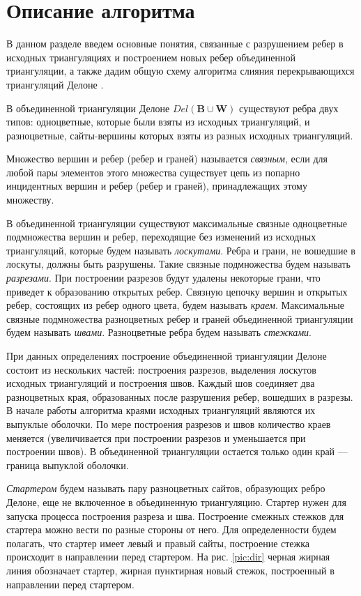 \documentclass[12pt]{article}
\begin{document}
\section{Описание алгоритма}
В данном разделе введем основные понятия, связанные с разрушением ребер в исходных триангуляциях
и построением новых ребер объединенной триангуляции,
а также дадим общую схему алгоритма слияния перекрывающихся триангуляций Делоне \cite{MestOverlap}.

В объединенной триангуляции Делоне $Del(\textbf{B} \cup \textbf{W})$ существуют ребра двух типов:
одноцветные, которые были взяты из исходных триангуляций, и разноцветные, сайты-вершины которых взяты из разных исходных триангуляций.

Множество вершин и ребер (ребер и граней) называется {\itshape связным}, если для любой пары элементов этого множества
существует цепь из попарно инцидентных вершин и ребер (ребер и граней), принадлежащих этому множеству.

В объединенной триангуляции существуют максимальные связные одноцветные подмножества вершин и ребер,
переходящие без изменений из исходных триангуляций, которые будем называть {\itshape лоскутами}.
Ребра и грани, не вошедшие в лоскуты, должны быть разрушены.
Такие связные подмножества будем называть {\itshape разрезами}.
При построении разрезов будут удалены некоторые грани, что приведет к образованию открытых ребер.
Связную цепочку вершин и открытых ребер, состоящих из ребер одного цвета, будем называть {\itshape краем}.
Максимальные связные подмножества разноцветных ребер и граней объединенной триангуляции будем называть {\itshape швами}.
Разноцветные ребра будем называть {\itshape стежками}.

При данных определениях построение объединенной триангуляции Делоне состоит из нескольких частей: построения разрезов,
выделения лоскутов исходных триангуляций и построения швов.
Каждый шов соединяет два разноцветных края, образованных после разрушения ребер, вошедших в разрезы.
В начале работы алгоритма краями исходных триангуляций являются их выпуклые оболочки.
По мере построения разрезов и швов количество краев меняется
(увеличивается при построении разрезов и уменьшается при построении швов).
В объединенной триангуляции остается только один край --- граница выпуклой оболочки.

{\itshape Стартером} будем называть пару разноцветных сайтов, образующих ребро Делоне,
еще не включенное в объединенную триангуляцию.
Стартер нужен для запуска процесса построения разреза и шва.
Построение смежных стежков для стартера можно вести по разные стороны от него.
Для определенности будем полагать, что стартер имеет левый и правый сайты,
построение стежка происходит в направлении перед стартером.
На рис. \ref{pic:dir} черная жирная линия обозначает стартер, жирная пунктирная новый стежок, построенный в направлении перед стартером.
\end{document}
